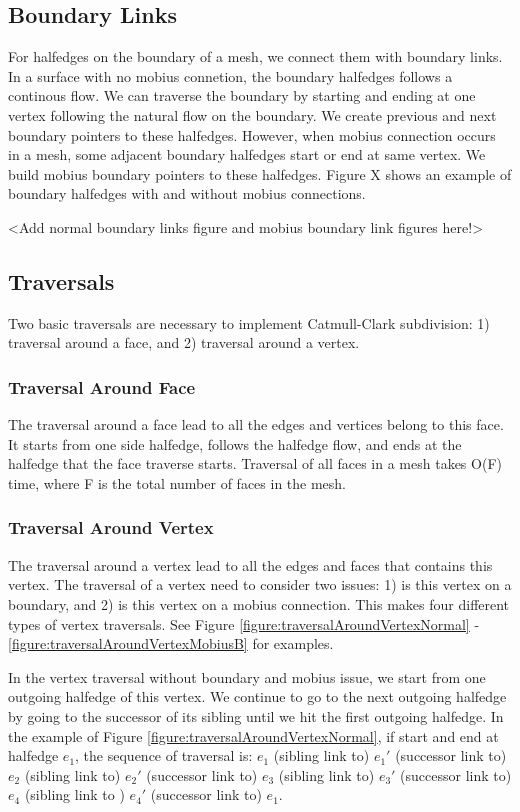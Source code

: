 \documentclass[12pt]{article}
\begin{document}
\subsection{Boundary Links}

For halfedges on the boundary of a mesh, we connect them with boundary links. In a surface with no mobius connetion, the boundary halfedges follows a continous flow. We can traverse the boundary by starting and ending at one vertex following the natural flow on the boundary. We create previous and next boundary pointers to these halfedges. However, when mobius connection occurs in a mesh, some adjacent boundary halfedges start or end at same vertex. We build mobius boundary pointers to these halfedges. Figure X shows an example of boundary halfedges with and without mobius connections.

<Add normal boundary links figure and mobius boundary link figures here!>

\subsection{Traversals} 
Two basic traversals are necessary to implement Catmull-Clark subdivision: 1) traversal around a face, and 2) traversal around a vertex.
\lstset{float=htpb, language=c++}
\subsubsection{Traversal Around Face}
The traversal around a face lead to all the edges and vertices belong to this face. It starts from one side halfedge, follows the halfedge flow, and ends at the halfedge that the face traverse starts.
Traversal of all faces in a mesh takes O(F) time, where F is the total number of faces in the mesh.
\subsubsection{Traversal Around Vertex}
The traversal around a vertex lead to all the edges and faces that contains this vertex. The traversal of a vertex need to consider two issues: 1) is this vertex on a boundary, and  2) is this vertex on a mobius connection. This makes four different types of vertex traversals. See Figure \ref{figure:traversalAroundVertexNormal} - \ref{figure:traversalAroundVertexMobiusB} for examples.

In the vertex traversal without boundary and mobius issue, we start from one outgoing halfedge of this vertex. We continue to go to the next outgoing halfedge by going to the successor of its sibling until we hit the first outgoing halfedge. In the example of Figure \ref{figure:traversalAroundVertexNormal}, if start and end at halfedge $e_1$, the sequence of traversal is: $e_1$ (sibling link to) $e_1'$ (successor link to) $e_2$ (sibling link to) $e_2'$ (successor link to) $e_3$ (sibling link to) $e_3'$ (successor link to) $e_4$ (sibling link to ) $e_4'$  (successor link to)  $e_1$.
\end{document}
